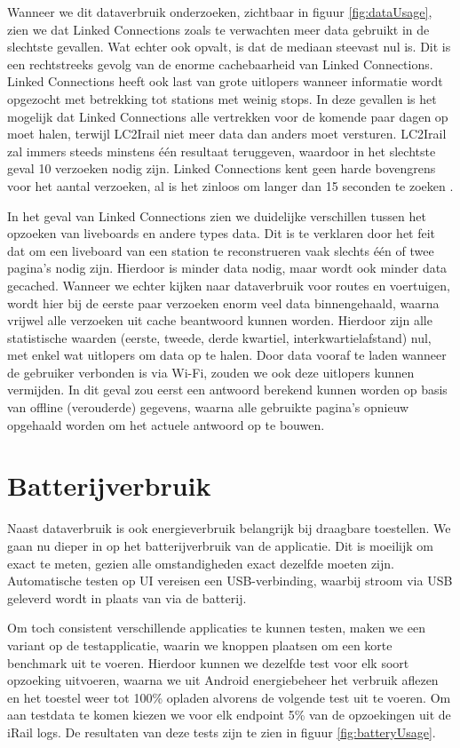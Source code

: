 Wanneer we dit dataverbruik onderzoeken, zichtbaar in figuur \ref{fig:dataUsage}, zien we dat Linked Connections zoals te verwachten meer data gebruikt in de slechtste gevallen. Wat echter ook opvalt, is dat de mediaan steevast nul is. Dit is een rechtstreeks gevolg van de enorme cachebaarheid van Linked Connections. Linked Connections heeft ook last van grote uitlopers wanneer informatie wordt opgezocht met betrekking tot stations met weinig stops. In deze gevallen is het mogelijk dat Linked Connections alle vertrekken voor de komende paar dagen op moet halen, terwijl LC2Irail niet meer data dan anders moet versturen. LC2Irail zal immers steeds minstens één resultaat teruggeven, waardoor in het slechtste geval 10 verzoeken nodig zijn. Linked Connections kent geen harde bovengrens voor het aantal verzoeken, al is het zinloos om langer dan 15 seconden te zoeken \citep{miller68}.

In het geval van Linked Connections zien we duidelijke verschillen tussen het opzoeken van liveboards en andere types data. Dit is te verklaren door het feit dat om een liveboard van een station te reconstrueren vaak slechts één of twee pagina's nodig zijn. Hierdoor is minder data nodig, maar wordt ook minder data gecached. Wanneer we echter kijken naar dataverbruik voor routes en voertuigen, wordt hier bij de eerste paar verzoeken enorm veel data binnengehaald, waarna vrijwel alle verzoeken uit cache beantwoord kunnen worden. Hierdoor zijn alle statistische waarden (eerste, tweede, derde kwartiel, interkwartielafstand) nul, met enkel wat uitlopers om data op te halen. Door data vooraf te laden wanneer de gebruiker verbonden is via Wi-Fi, zouden we ook deze uitlopers kunnen vermijden. In dit geval zou eerst een antwoord berekend kunnen worden op basis van offline (verouderde) gegevens, waarna alle gebruikte pagina's opnieuw opgehaald worden om het actuele antwoord op te bouwen.


\section{Batterijverbruik}
Naast dataverbruik is ook energieverbruik belangrijk bij draagbare toestellen. We gaan nu dieper in op het batterijverbruik van de applicatie. Dit is moeilijk om exact te meten, gezien alle omstandigheden exact dezelfde moeten zijn. Automatische testen op UI vereisen een USB-verbinding, waarbij stroom via USB geleverd wordt in plaats van via de batterij. 

Om toch consistent verschillende applicaties te kunnen testen, maken we een variant op de testapplicatie, waarin we knoppen plaatsen om een korte benchmark uit te voeren. Hierdoor kunnen we dezelfde test voor elk soort opzoeking uitvoeren, waarna we uit Android energiebeheer het verbruik aflezen en het toestel weer tot 100\% opladen alvorens de volgende test uit te voeren. Om aan testdata te komen kiezen we voor elk endpoint 5\% van de opzoekingen uit de iRail logs. De resultaten van deze tests zijn te zien in figuur \ref{fig:batteryUsage}.

